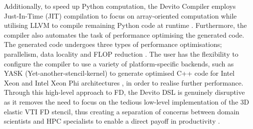 Additionally, to speed up Python computation, the Devito Compiler employs Just-In-Time (JIT) compilation to focus on array-oriented computation while utilising LLVM to compile remaining Python code at runtime \citep{lange2016devito}. Furthermore, the compiler also automates the task of performance optimising the generated code. The generated code undergoes three types of performance optimisations; parallelism, data locality and FLOP reduction \citep{luporini2018architecture, louboutin2020scaling}. The user has the flexibility to configure the compiler to use a variety of platform-specific backends, such as YASK (Yet-another-stencil-kernel) to generate optimised C++ code for Intel Xeon and Intel Xeon Phi architectures \citep{luporini2018architecture}, in order to realise further performance. Through this high-level approach to FD, the Devito DSL is genuinely disruptive as it removes the need to focus on the tedious low-level implementation of the 3D elastic VTI FD stencil, thus creating a separation of concerns between domain scientists and HPC specialists to enable a direct payoff in productivity \citep{lange2016devito}.



